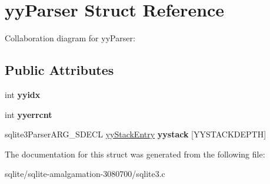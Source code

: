 \hypertarget{structyy_parser}{\section{yy\+Parser Struct Reference}
\label{structyy_parser}
}


Collaboration diagram for yy\+Parser\+:
\subsection*{Public Attributes}
\begin{DoxyCompactItemize}
\item 
\hypertarget{structyy_parser_a19abcf4780515fd2debd1ce7a2e29f95}{int {\bfseries yyidx}}\label{structyy_parser_a19abcf4780515fd2debd1ce7a2e29f95}

\item 
\hypertarget{structyy_parser_ac0350933aa515a3a756dfa742d04ee59}{int {\bfseries yyerrcnt}}\label{structyy_parser_ac0350933aa515a3a756dfa742d04ee59}

\item 
\hypertarget{structyy_parser_ae8bc1531d6ae56020a7ee33a40783672}{sqlite3\+Parser\+A\+R\+G\+\_\+\+S\+D\+E\+C\+L \hyperlink{structyy_stack_entry}{yy\+Stack\+Entry} {\bfseries yystack} \mbox{[}Y\+Y\+S\+T\+A\+C\+K\+D\+E\+P\+T\+H\mbox{]}}\label{structyy_parser_ae8bc1531d6ae56020a7ee33a40783672}

\end{DoxyCompactItemize}


The documentation for this struct was generated from the following file\+:\begin{DoxyCompactItemize}
\item 
sqlite/sqlite-\/amalgamation-\/3080700/sqlite3.\+c\end{DoxyCompactItemize}
